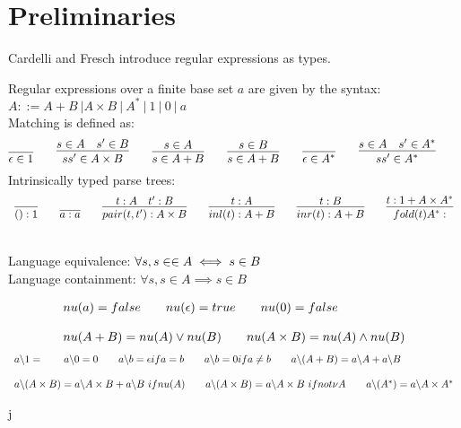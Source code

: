 \documentclass[a4paper,UKenglish,cleveref, autoref, thm-restate]{lipics-v2021}
\begin{document}
\section{Preliminaries}
Cardelli and Fresch introduce regular expressions as types.
\begin{definition}
Regular expressions over a finite base set $a$ are given by the syntax:\\
$A ::= A + B~| A \times B ~|~A ^* ~|~ 1 ~|~ 0 ~|~ a$\\
Matching is defined as:\\
\begin{displaymath} 
\infer{\match{\epsilon}{1}}{}\qquad
\infer{\match{s s'}{A \times B}}{\match{s}{A} & \match{s'}{B}} \qquad
\infer{\match{s} {A + B}}{\match{s}{A}} \qquad
\infer{\match{s} {A + B}}{\match{s}{B}} \qquad
\infer{\match{\epsilon}{A^*}}{}\qquad
\infer{\match{s s'}{A^*}}{\match{s}{A} & \match{s'}{A^*}}\qquad
\end{displaymath}
Intrinsically typed parse trees:
\begin{displaymath}
\begin{array}{l}
\infer{\oft{()}{1}}{} \qquad 
\infer{\oft{a}{a}}{} \qquad \infer{\oft{\pair{t}{t'}}{A \times B}}{\oft{t}{A} & \oft{t'}{B}}
\qquad \infer{\oft{\inl {t}}{A + B}}{\oft{t}{A}} \qquad
\infer{\oft{\inr {t}}{A + B}}{\oft{t}{B}}  \qquad
\infer{\oft{\fold{t}{A^*}}}{\oft{t}{1 + A \times A^*}}
\end{array}
\end{displaymath}
\end{definition}
\begin{definition}[Equivalence] \noindent \\
Language equivalence: $\forall s, s \in \in A \iff s \in B$\\
Language containment: $\forall s, s \in A \implies s \in B$
\end{definition}
\begin{definition}
\begin{displaymath}
\begin{array}{l}
\mynu{a} = \false \qquad
\mynu{\epsilon} = \true \qquad
\mynu{0} = \false
\\\\
\mynu{A + B} = \mynu A  \lor \mynu B \qquad
\mynu{A \times B} = \mynu A  \land \mynu B
\end{array}
\end{displaymath}
\begin{displaymath}
\begin{array}{l}
\derive {a}{1} = \qquad
\derive{a}{0} = 0 \qquad
\derive{a}{b} = \epsilon if a = b\qquad
\derive{a}{b} = 0 if a \neq b\qquad
\derive {a}{(A + B)} = \derive{a}{A} +  \derive{a}{B}\qquad
\\\\
\derive {a}{(A \times B)} = \derive{a}{A} \times B +  \derive{a}{B} ~if \mynu{A} \qquad
\derive {a}{(A \times B)} = \derive{a}{A} \times B ~if not \nu{A} \qquad
\derive {a}{(A^*)} = \derive{a}{A} \times A^*
\end{array}
\end{displaymath}
\end{definition}j
\end{document}
